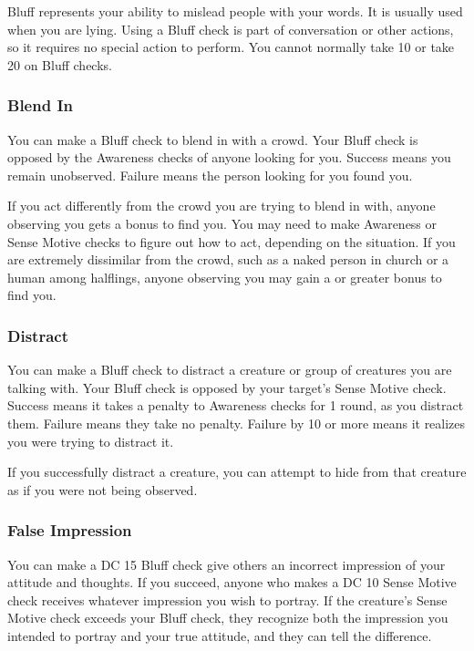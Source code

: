 Bluff represents your ability to mislead people with your words. It is usually used when you are lying. Using a Bluff check is part of conversation or other actions, so it requires no special action to perform. You cannot normally take 10 or take 20 on Bluff checks.

\subsubsection{Blend In}
You can make a Bluff check to blend in with a crowd. Your Bluff check is opposed by the Awareness checks of anyone looking for you. Success means you remain unobserved. Failure means the person looking for you found you.

If you act differently from the crowd you are trying to blend in with, anyone observing you gets a  bonus to find you. You may need to make Awareness or Sense Motive checks to figure out how to act, depending on the situation. If you are extremely dissimilar from the crowd, such as a naked person in church or a human among halflings, anyone observing you may gain a  or greater bonus to find you.

\subsubsection{Distract}
You can make a Bluff check to distract a creature or group of creatures you are talking with. Your Bluff check is opposed by your target's Sense Motive check. Success means it takes a  penalty to Awareness checks for 1 round, as you distract them. Failure means they take no penalty. Failure by 10 or more means it realizes you were trying to distract it.

If you successfully distract a creature, you can attempt to hide from that creature as if you were not being observed.

\subsubsection{False Impression}
You can make a DC 15 Bluff check give others an incorrect impression of your attitude and thoughts. If you succeed, anyone who makes a DC 10 Sense Motive check receives whatever impression you wish to portray. If the creature's Sense Motive check exceeds your Bluff check, they recognize both the impression you intended to portray and your true attitude, and they can tell the difference.

